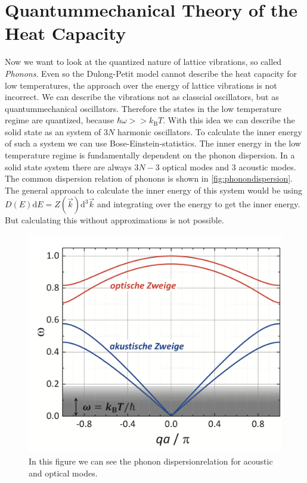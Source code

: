 \section{Quantummechanical Theory of the Heat Capacity}
\label{sec:quantum}
Now we want to look at the quantized nature of lattice vibrations, so called \textit{Phonons}. Even so the Dulong-Petit model cannot describe the heat capacity for low temperatures,
the approach over the energy of lattice vibrations is not incorrect. We can describe the vibrations not as classcial oscillators, but as quantummechanical oscillators. Therefore the 
states in the low temperature regime are quantized, because $\hbar\omega >> k_\mathrm{B}T$. With this idea we can describe the solid state as an system of $3N$ harmonic oscillators.
To calculate the inner energy of such a system we can use Bose-Einstein-statistics. The inner energy in the low temperature regime is fundamentally dependent on the phonon dispersion.
In a solid state system there are always $3N - 3$ optical modes and $3$ acoustic modes. The common dispersion relation of phonons is shown in \autoref{fig:phonondispersion}. The general
approach to calculate the inner energy of this system would be using $D(E)\mathrm{d}E = Z(\vec{k})\mathrm{d^3}\vec{k}$ and integrating over the energy to get the inner energy. But 
calculating this without approximations is not possible.

\begin{figure}
    \centering
    \includegraphics[scale=0.4]{content/V47_pictures/phonondispersion.png}
    \caption{In this figure we can see the phonon dispersionrelation for acoustic and optical modes. \cite{grossmarx}}
    \label{fig:phonondispersion}
\end{figure}

